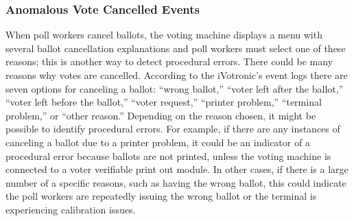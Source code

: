 \subsubsection{Anomalous Vote Cancelled Events}
When poll workers cancel ballots, the voting machine displays a menu with several ballot cancellation explanations and poll workers must select one of these reasons; this is another way to detect procedural errors. There could be many reasons why votes are cancelled. According to the iVotronic’s event logs there are seven options for canceling a ballot: \textquotedblleft wrong ballot,\textquotedblright \hspace{1 mm} \textquotedblleft voter left after the ballot,\textquotedblright \hspace{1 mm}  \textquotedblleft voter left before the ballot,\textquotedblright \hspace{1 mm}  \textquotedblleft voter request,\textquotedblright \hspace{1 mm}  \textquotedblleft printer problem,\textquotedblright \hspace{1 mm}  \textquotedblleft terminal problem,\textquotedblright \hspace{1 mm}  or \textquotedblleft other reason.\textquotedblright \hspace{2 mm}  Depending on the reason chosen, it might be possible to identify procedural errors.  For example, if there are any instances of canceling a ballot due to a printer problem, it could be an indicator of a procedural error because ballots are not printed, unless the voting machine is connected to a voter verifiable print out module. In other cases, if there is a large number of a specific reasons, such as having the wrong ballot, this could indicate the poll workers are repeatedly issuing the wrong ballot or the terminal is experiencing calibration issues.  

